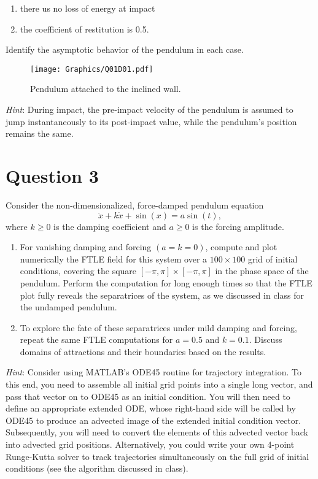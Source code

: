 \documentclass[twoside,10pt,a4paper]{article}
\begin{document}
\begin{enumerate}[label=(\roman*)]
	\item there us no loss of energy at impact
	\item the coefficient of restitution is 0.5.
\end{enumerate}
Identify the asymptotic behavior of the pendulum in each case.

\begin{figure}[H]
	\centering
	\texttt{[image: Graphics/Q01D01.pdf]}
	\caption{Pendulum attached to the inclined wall.}
	\label{Q01D01}
\end{figure}

\textit{Hint}: During impact, the pre-impact velocity of the pendulum is assumed to jump instantaneously to its post-impact value, while the pendulum's position remains the same.

\section*{Question 3}
Consider the non-dimensionalized, force-damped pendulum equation
\begin{equation*}
	\ddot{x} + k\dot{x} + \sin(x) = a\sin(t),
\end{equation*}
where $k \geq 0$ is the damping coefficient and $a \geq 0$ is the forcing amplitude.

\begin{enumerate}[label=(\alph*)]
	\item For vanishing damping and forcing $(a=k=0)$, compute and plot numerically the FTLE field for this system over a $100 \times 100$ grid of initial conditions, covering the square $[- \pi, \pi] \times [-\pi, \pi]$ in the phase space of the pendulum. Perform the computation for long enough times so that the FTLE plot fully reveals the separatrices of the system, as we discussed in class for the undamped pendulum.
	\item To explore the fate of these separatrices under mild damping and forcing, repeat the same FTLE computations for $a = 0.5$ and $k = 0.1$. Discuss domains of attractions and their boundaries based on the results.
\end{enumerate}

\textit{Hint}: Consider using MATLAB’s ODE45 routine for trajectory integration. To this end, you need to assemble all initial grid points into a single long vector, and pass that vector on to ODE45 as an initial condition. You will then need to define an appropriate extended ODE, whose right-hand side will be called by ODE45 to produce an advected image of the extended initial condition vector. Subsequently, you will need to convert the elements of this advected vector back into advected grid positions.
Alternatively, you could write your own 4-point Runge-Kutta solver to track trajectories simultaneously on the full grid of initial conditions (see the algorithm discussed in class).
\end{document}
